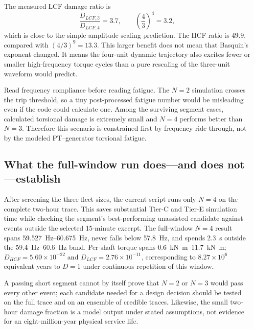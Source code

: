 \documentclass[11pt]{article}
\begin{document}
The measured LCF damage ratio is
\begin{equation}
  \frac{D_{LCF,3}}{D_{LCF,4}}=3.7,
  \qquad \left(\frac{4}{3}\right)^4=3.2,
\end{equation}
which is close to the simple amplitude-scaling prediction.  The HCF ratio is
$49.9$, compared with $(4/3)^9=13.3$.  This larger benefit does not mean that
Basquin's exponent changed.  It means the four-unit dynamic trajectory also
excites fewer or smaller high-frequency torque cycles than a pure rescaling
of the three-unit waveform would predict.

\begin{focusbox}
Read frequency compliance before reading fatigue.  The $N=2$ simulation
crosses the trip threshold, so a tiny post-processed fatigue number would be
misleading even if the code could calculate one.  Among the surviving
segment cases, calculated torsional damage is extremely small and $N=4$
performs better than $N=3$.  Therefore this scenario is constrained first by
frequency ride-through, not by the modeled PT--generator torsional fatigue.
\end{focusbox}

\subsection{What the full-window run does---and does not---establish}

After screening the three fleet sizes, the current script runs only $N=4$ on
the complete two-hour trace.  This saves substantial Tier-C and Tier-E
simulation time while checking the segment's best-performing unassisted
candidate against events outside the selected 15-minute excerpt.  The
full-window $N=4$ result spans \SIrange{59.527}{60.675}{Hz}, never falls below
\SI{57.8}{Hz}, and spends \SI{2.3}{s} outside the
\SIrange{59.4}{60.6}{Hz} band.  Per-shaft torque spans
\SIrange{0.6}{11.7}{kN.m}; $D_{HCF}=5.60\times10^{-22}$ and
$D_{LCF}=2.76\times10^{-11}$, corresponding to $8.27\times10^6$ equivalent
years to $D=1$ under continuous repetition of this window.

A passing short segment cannot by itself prove that $N=2$ or $N=3$ would pass
every other event; each candidate needed for a design decision should be
tested on the full trace and on an ensemble of credible traces.  Likewise,
the small two-hour damage fraction is a model output under stated assumptions,
not evidence for an eight-million-year physical service life.
\end{document}

